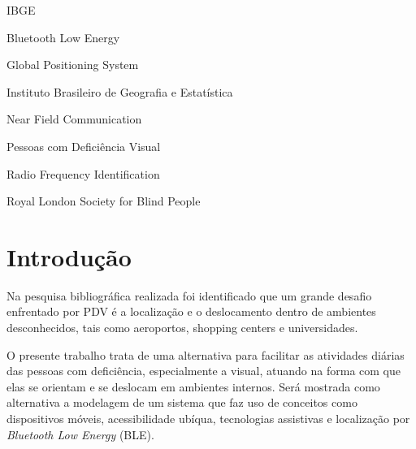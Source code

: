 \documentclass[english,brazilian]{UNISINOSmonografia}
\begin{document}
\begin{listadesiglas}{IBGE}
\item[BLE] Bluetooth Low Energy
\item[GPS] Global Positioning System
\item[IBGE] Instituto Brasileiro de Geografia e Estatística
\item[NFC] Near Field Communication
\item[PDV] Pessoas com Deficiência Visual
\item[RFID] Radio Frequency Identification
\item[RLSB]	Royal London Society for Blind People
\end{listadesiglas}

\tableofcontents

\chapter{Introdução} %
Na pesquisa bibliográfica realizada foi identificado que um grande desafio enfrentado por PDV é a localização e o deslocamento dentro de ambientes desconhecidos, tais como aeroportos, shopping centers e universidades.

O presente trabalho trata de uma alternativa para facilitar as atividades diárias das pessoas com deficiência, especialmente a visual, atuando na forma com que elas se orientam e se deslocam em ambientes internos.
Será mostrada como alternativa a modelagem de um sistema que faz uso de conceitos como dispositivos móveis, acessibilidade ubíqua, tecnologias assistivas e localização por \textit{Bluetooth Low Energy} (BLE).
\end{document}
